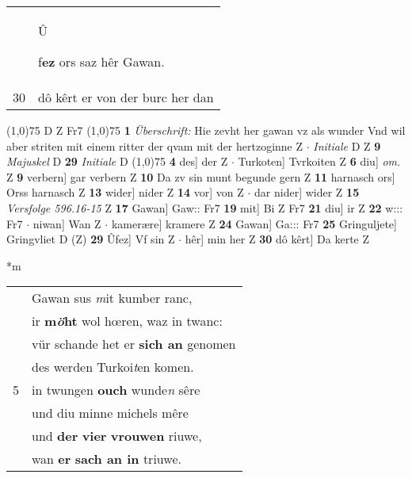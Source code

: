 \documentclass[8pt,a4paper,notitlepage]{article}
\begin{document}
\begin{table}[ht]
\begin{minipage}[t]{0.5\linewidth}
\begin{tabular}{rl}
 & \begin{large}Û\end{large}f\textbf{ez} ors saz hêr Gawan.\\ 
30 & dô kêrt er von der burc her dan\\ 
\end{tabular}
\scriptsize
\line(1,0){75} \newline
D Z Fr7 \newline
\line(1,0){75} \newline
\textbf{1} \textit{Überschrift:} Hie zevht her gawan vz als wunder Vnd wil aber striten mit einem ritter der qvam mit der hertzoginne Z   $\cdot$ \textit{Initiale} D Z  \textbf{9} \textit{Majuskel} D  \textbf{29} \textit{Initiale} D  \newline
\line(1,0){75} \newline
\textbf{4} des] der Z  $\cdot$ Turkoten] Tvrkoiten Z \textbf{6} diu] \textit{om.} Z \textbf{9} verbern] gar verbern Z \textbf{10} Da zv sin munt begunde gern Z \textbf{11} harnasch ors] Orss harnasch Z \textbf{13} wider] nider Z \textbf{14} vor] von Z  $\cdot$ dar nider] wider Z \textbf{15} \textit{Versfolge 596.16-15} Z  \textbf{17} Gawan] Gaw:: Fr7 \textbf{19} mit] Bi Z Fr7 \textbf{21} diu] ir Z \textbf{22} w::: Fr7  $\cdot$ niwan] Wan Z  $\cdot$ kamerære] kramere Z \textbf{24} Gawan] Ga::: Fr7 \textbf{25} Gringuljete] Gringvliet D (Z) \textbf{29} Ûfez] Vf sin Z  $\cdot$ hêr] min her Z \textbf{30} dô kêrt] Da kerte Z \newline
\end{minipage}
\hspace{0.5cm}
\begin{minipage}[t]{0.5\linewidth}
\small
\begin{center}*m
\end{center}
\begin{tabular}{rl}
 & Gawan sus \textit{m}it kumber ranc,\\ 
 & ir \textbf{m\textit{ö}ht} wol hœren, waz in twanc:\\ 
 & vür schande het er \textbf{sich an} genomen\\ 
 & des werden Turkoi\textit{t}en komen.\\ 
5 & in twungen \textbf{ouch} wunde\textit{n} sêre\\ 
 & und diu minne michels mêre\\ 
 & und \textbf{der} \textbf{vier} \textbf{vrouwen} riuwe,\\ 
 & wan \textbf{er} \textbf{sach an in} triuwe.\\ 

\end{tabular}
\end{minipage}
\end{table}
\end{document}
